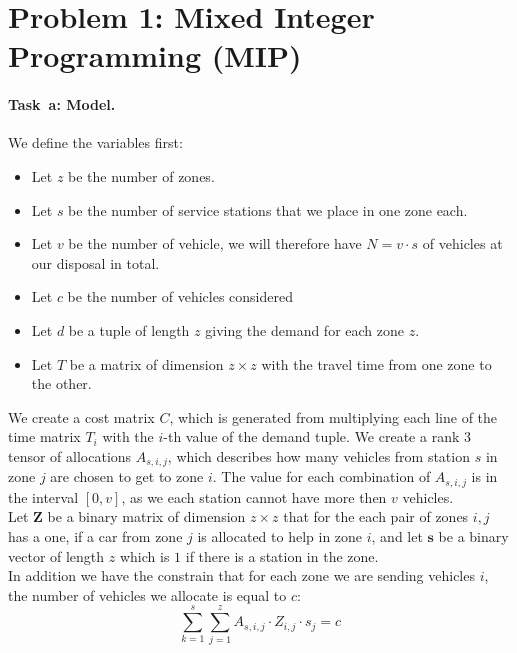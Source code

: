 \section*{Problem 1: Mixed Integer Programming (MIP)}

\newcommand{\SolverMIP}{\todo{Gurobi}\xspace}  %
\newcommand{\TimeoutMIP}{\todo{300.00}}  %
\newcommand{\norm}[1]{\Vert {#1} \Vert}

\paragraph{Task~a: Model.}
We define the variables first:
\begin{itemize}
  \item Let $z$ be the number of zones.
  \item Let $s$ be the number of service stations that we place in one zone each. 
  \item Let $v$ be the number of vehicle, we will therefore have $N = v \cdot s$ of vehicles at our disposal in total.
  \item Let $c$ be the number of vehicles considered
  \item Let $d$ be a tuple of length $z$ giving the demand for each zone $z$.
  \item Let $T$ be a matrix of dimension $z \times z$ with the travel time from one zone to the other.
\end{itemize}

We create a cost matrix $C$, which is generated from multiplying each line of the time matrix $T_i$ with the $i$-th value of the demand tuple. We create a rank 3 tensor of allocations $A_{s, i, j}$, which describes how many vehicles from station $s$ in zone $j$ are chosen to get to zone $i$. The value for each combination of $A_{s, i, j}$ is in the interval $[0, v]$, as we each station cannot have more then $v$ vehicles. \\
Let $\mathbf{Z}$ be a binary matrix of dimension $z \times z$ that for the each pair of zones $i, j$ has a one, if a car from zone $j$ is allocated to help in zone $i$, and let $\mathbf{s}$ be a binary vector of length $z$ which is $1$ if there is a station in the zone.  \\
In addition we have the constrain that for each zone we are sending vehicles $i$, the number of vehicles we allocate is equal to $c$:
\begin{equation*}
	\sum_{k=1}^{s} \sum_{j=1}^{z} A_{s, i, j} \cdot Z_{i, j} \cdot s_{j} = c
\end{equation*}


